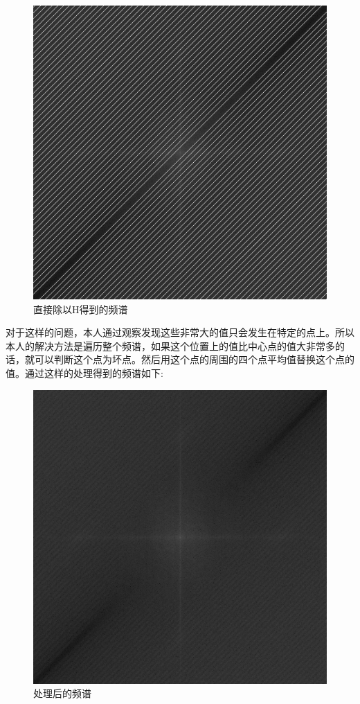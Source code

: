 \documentclass{article}
\begin{document}
		\begin{figure}[H]
			\centering
			\includegraphics[scale = 0.5]{no_process.png}
			\caption{直接除以H得到的频谱}
		\end{figure}
		
		对于这样的问题，本人通过观察发现这些非常大的值只会发生在特定的点上。所以本人的解决方法是遍历整个频谱，如果这个位置上的值比中心点的值大非常多的话，就可以判断这个点为坏点。然后用这个点的周围的四个点平均值替换这个点的值。通过这样的处理得到的频谱如下:
		
		\begin{figure}[H]
			\centering
			\includegraphics[scale = 0.5]{process.png}
			\caption{处理后的频谱}
		\end{figure}
		
\end{document}
